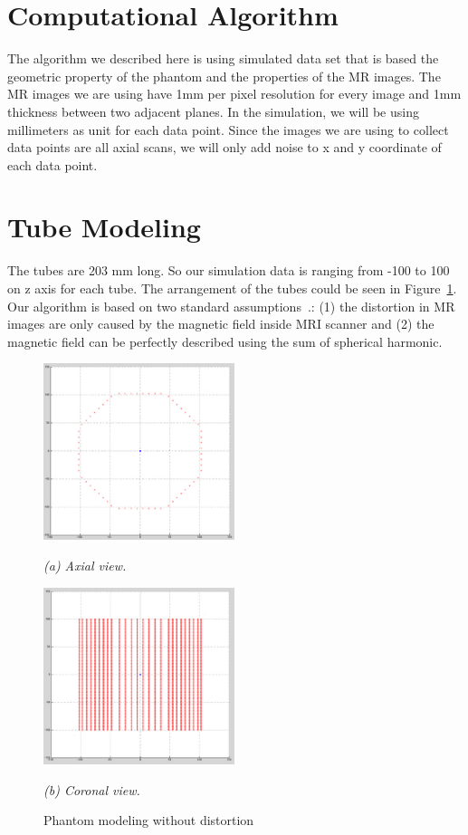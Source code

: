 \section{Computational Algorithm}

The algorithm we described here is using simulated data set that is based the
geometric property of the phantom and the properties of the MR images.
The MR images we are using have 1mm per pixel resolution for every image and
1mm thickness between two adjacent planes. In the simulation, we will be using millimeters as unit for
each data point. Since the images we are using to collect data points are all axial scans,
we will only add noise to x and y coordinate of each data point.

\section{Tube Modeling}

The tubes are 203 mm long. So our simulation data is ranging from -100 to 100 on z axis for each tube.
The arrangement of the tubes could be seen in Figure~\ref{fig:1}.
Our algorithm is based on two standard assumptions~\cite{LSS06a,LSS06b,LSS08a,tlee_iaeng,simple_approach}.: (1) the distortion in MR images are only caused by the magnetic field inside MRI scanner and (2) the magnetic field can be perfectly described using the sum of spherical harmonic.

\begin{figure}[htb]

  \begin{minipage}[b]{2.2in}
    \centering
    \centerline{\mbox{\includegraphics[width=2.2in]{isocenter/images/simulation/axial_no_distortion.eps}}}
    \centerline{\emph{(a) Axial view.}}
  \end{minipage}
  \hfill
  \begin{minipage}[b]{2.2in}
    \centering
    \centerline{\mbox{\includegraphics[width=2.2in]{isocenter/images/simulation/coronal_no_distortion.eps}}}
    \centerline{\emph{(b) Coronal view.}}
  \end{minipage}
%
  \caption{Phantom modeling without distortion} 
  \label{fig:1}
%
\end{figure}

